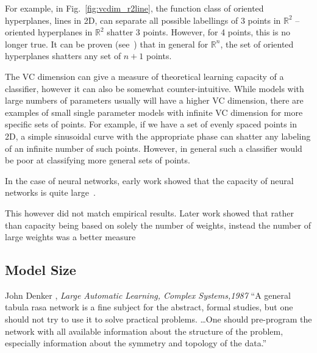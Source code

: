 \documentclass[thesis]{subfiles}
\begin{document}
    For example, in Fig.\ \ref{fig:vcdim_r2line}, the function class of oriented hyperplanes, \ie lines in 2D, can separate all possible labellings of 3 points in $\mathbb{R}^2$ -- oriented hyperplanes in $\mathbb{R}^2$ shatter 3 points. However, for 4 points, this is no longer true. It can be proven (see~\citet{burges1998tutorial}) that in general for $\mathbb{R}^n$, the set of oriented hyperplanes shatters any set of $n+1$ points.

    The VC dimension can give a measure of theoretical learning capacity of a classifier, however it can also be somewhat counter-intuitive. While models with large numbers of parameters usually will have a higher VC dimension, there are examples of small single parameter models with infinite VC dimension for more specific sets of points. For example, if we have a set of evenly spaced points in 2D, a simple sinusoidal curve with the appropriate phase can shatter any labeling of an infinite number of such points. However, in general such a classifier would be poor at classifying more general sets of points.
    
    In the case of neural networks, early work showed that the capacity of neural networks is quite large~\citep{hornik89a,baum1989size}.
    
    This however did not match empirical results. Later work showed that rather than capacity being based on solely the number of weights, instead the number of large weights was a better measure~\citep{bartlett1997}
    
	
    \subsection{Model Size}
	\begin{chapquote}{John Denker \etal, \textit{Large Automatic Learning, Complex Systems,1987}}
		``A general tabula rasa network is a fine subject for the abstract, formal studies, but one should not try to use it to solve practical problems. \ldots One should pre-program the network with all available information about the structure of the problem, especially information about the symmetry and topology of the data.''
	\end{chapquote}
	
\end{document}

